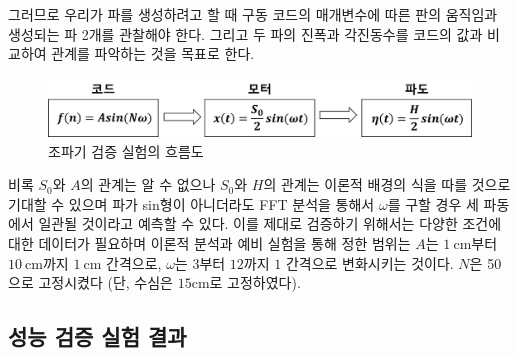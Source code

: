 그러므로 우리가 파를 생성하려고 할 때 구동 코드의 매개변수에 따른 판의 움직임과 생성되는 파 2개를 관찰해야 한다. 그리고 두 파의 진폭과 각진동수를 코드의 값과 비교하여 관계를 파악하는 것을 목표로 한다.

\begin{figure}[H]
    \centering
    \includegraphics[width=12cm]{images/Flow_Chart(Analysis System_Kor).jpg}
    \caption{조파기 검증 실험의 흐름도}
    \label{Flow_Chart}
\end{figure}

비록 $S_0$와 $A$의 관계는 알 수 없으나 $S_0$와 $H$의 관계는 이론적 배경의 식을 따를 것으로 기대할 수 있으며 파가 sin형이 아니더라도 FFT 분석을 통해서 $\omega$를 구할 경우 세 파동에서 일관될 것이라고 예측할 수 있다.
이를 제대로 검증하기 위해서는 다양한 조건에 대한 데이터가 필요하며 이론적 분석과 예비 실험을 통해 정한 범위는 $A$는 $1\mathrm{~cm}$부터 $10\mathrm{~cm}$까지 $1\mathrm{~cm}$ 간격으로, $\omega$는 $3$부터 $12$까지 $1$ 간격으로 변화시키는 것이다. $N$은 50으로 고정시켰다 (단, 수심은 $15\mathrm{cm}$로 고정하였다).


\subsection{성능 검증 실험 결과}

